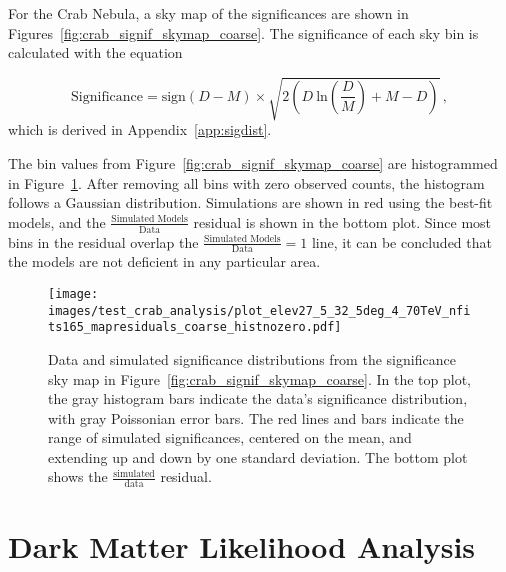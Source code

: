 For the Crab Nebula, a sky map of the significances are shown in Figures~\ref{fig:crab_signif_skymap_coarse}.
The significance of each sky bin is calculated with the equation

\begin{equation}\label{eqn:resmap_signif}
  \textrm{Significance} = \textrm{sign}(D-M) \times \sqrt{ 2 \left ( D \: \textrm{ln} \left ( \frac{D}{M} \right ) + M - D \right ) } \,,
\end{equation}
which is derived in Appendix~\ref{app:sigdist}.

The bin values from Figure~\ref{fig:crab_signif_skymap_coarse} are histogrammed in Figure~\ref{fig:crab_signif_distribution}.
After removing all bins with zero observed counts, the histogram follows a Gaussian distribution.
Simulations are shown in red using the best-fit models, and the $\frac{\textrm{Simulated Models}}{\textrm{Data}}$ residual is shown in the bottom plot.
Since most bins in the residual overlap the ${\frac{\textrm{Simulated Models}}{\textrm{Data}} = 1}$ line, it can be concluded that the models are not deficient in any particular area.

\begin{figure}[tb]
  \centering
  \texttt{[image: images/test\_crab\_analysis/plot\_elev27\_5\_32\_5deg\_4\_70TeV\_nfits165\_mapresiduals\_coarse\_histnozero.pdf]}
  \caption[Crab Residual Bin Distribution]{
    Data and simulated significance distributions from the significance sky map in Figure~\ref{fig:crab_signif_skymap_coarse}.
    In the top plot, the gray histogram bars indicate the data's significance distribution, with gray Poissonian error bars.
    The red lines and bars indicate the range of simulated significances, centered on the mean, and extending up and down by one standard deviation.
    The bottom plot shows the $\frac{\textrm{simulated}}{\textrm{data}}$ residual.
  }
  \label{fig:crab_signif_distribution}
\end{figure}
  
\FloatBarrier

\section{Dark Matter Likelihood Analysis}\label{sec:dmlike}
  
